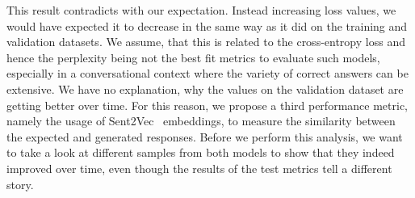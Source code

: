 This result contradicts with our expectation. Instead increasing loss values, we would have expected it to decrease in the same way as it did on the training and validation datasets. We assume, that this is related to the cross-entropy loss and hence the perplexity being not the best fit metrics to evaluate such models, especially in a conversational context where the variety of correct answers can be extensive. We have no explanation, why the values on the validation dataset are getting better over time. For this reason, we propose a third performance metric, namely the usage of Sent2Vec~\cite{Pgj:2017} embeddings, to measure the similarity between the expected and generated responses. Before we perform this analysis, we want to take a look at different samples from both models to show that they indeed improved over time, even though the results of the test metrics tell a different story.

